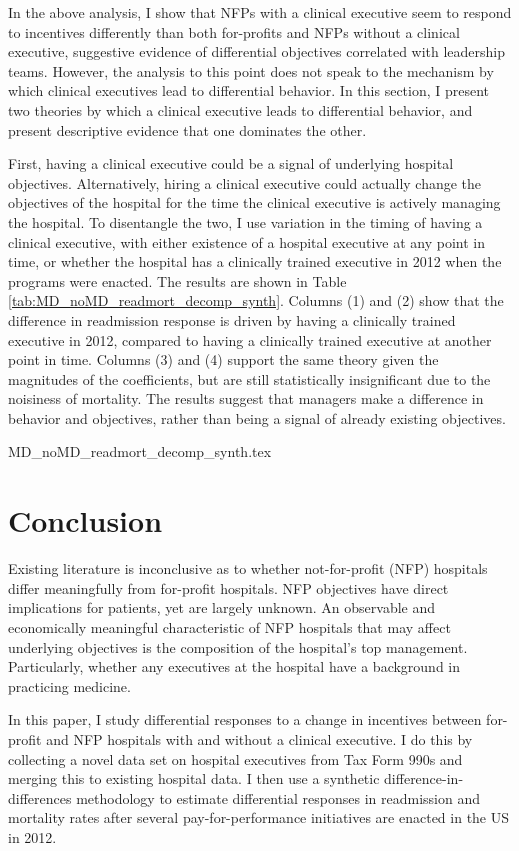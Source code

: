 \documentclass[12pt]{article}
\begin{document}
    In the above analysis, I show that NFPs with a clinical executive seem to respond to incentives differently than both for-profits and NFPs without a clinical executive, suggestive evidence of differential objectives correlated with leadership teams. However, the analysis to this point does not speak to the mechanism by which clinical executives lead to differential behavior. In this section, I present two theories by which a clinical executive leads to differential behavior, and present descriptive evidence that one dominates the other. 
    
    First, having a clinical executive could be a signal of underlying hospital objectives. Alternatively, hiring a clinical executive could actually change the objectives of the hospital for the time the clinical executive is actively managing the hospital. To disentangle the two, I use variation in the timing of having a clinical executive, with either existence of a hospital executive at any point in time, or whether the hospital has a clinically trained executive in 2012 when the programs were enacted. The results are shown in Table \ref{tab:MD_noMD_readmort_decomp_synth}. Columns (1) and (2) show that the difference in readmission response is driven by having a clinically trained executive in 2012, compared to having a clinically trained executive at another point in time. Columns (3) and (4) support the same theory given the magnitudes of the coefficients, but are still statistically insignificant due to the noisiness of mortality. The results suggest that managers make a difference in behavior and objectives, rather than being a signal of already existing objectives. 

    {MD_noMD_readmort_decomp_synth.tex}


    \section{Conclusion}

    Existing literature is inconclusive as to whether not-for-profit (NFP) hospitals differ meaningfully from for-profit hospitals. NFP objectives have direct implications for patients, yet are largely unknown. An observable and economically meaningful characteristic of NFP hospitals that may affect underlying objectives is the composition of the hospital's top management. Particularly, whether any executives at the hospital have a background in practicing medicine.

    In this paper, I study differential responses to a change in incentives between for-profit and NFP hospitals with and without a clinical executive. I do this by collecting a novel data set on hospital executives from Tax Form 990s and merging this to existing hospital data. I then use a synthetic difference-in-differences methodology to estimate differential responses in readmission and mortality rates after several pay-for-performance initiatives are enacted in the US in 2012. 
    
\end{document}
